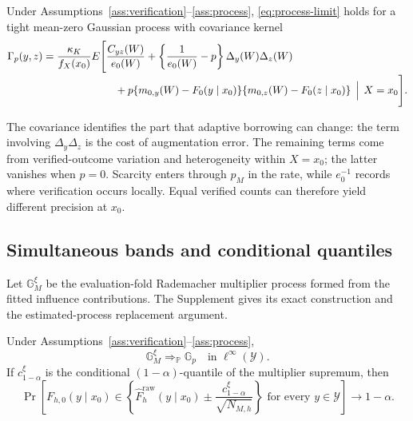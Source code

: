 \begin{theorem}
\label{thm:process}
Under Assumptions~\ref{ass:verification}--\ref{ass:process},
\eqref{eq:process-limit} holds for a tight
mean-zero Gaussian process with covariance kernel
\begin{align}
\Gamma_p(y,z)
&=
\frac{\kappa_K}{f_X(x_0)}
E\Bigg[
\frac{C_{yz}(W)}{e_0(W)}
+
\left\{\frac1{e_0(W)}-p\right\}
\Delta_y(W)\Delta_z(W)
\nonumber\\[-2pt]
&\hspace{24mm}
+p\{m_{0,y}(W)-F_0(y\mid x_0)\}
  \{m_{0,z}(W)-F_0(z\mid x_0)\}
\,\Bigm|\,X=x_0
\Bigg].
\label{eq:cov-limit}
\end{align}
\end{theorem}

The covariance identifies the part that adaptive borrowing can change: the
term involving \(\Delta_y\Delta_z\) is the cost of augmentation error. The
remaining terms come from verified-outcome variation and heterogeneity within
\(X=x_0\); the latter vanishes when \(p=0\). Scarcity enters through \(p_M\) in
the rate, while \(e_0^{-1}\) records where verification occurs locally. Equal
verified counts can therefore yield different precision at \(x_0\).

\subsection{Simultaneous bands and conditional quantiles}

Let \(\mathbb G_M^\xi\) be the evaluation-fold Rademacher multiplier process
formed from the fitted influence contributions. The Supplement gives its exact
construction and the estimated-process replacement argument.

\begin{theorem}
\label{thm:bootstrap}
Under Assumptions~\ref{ass:verification}--\ref{ass:process},
\begin{equation}
\mathbb G_M^\xi
\Rightarrow_{\mathbb P}
\mathbb G_p
\quad\text{in }\ell^\infty(\mathcal Y).
\label{eq:bootstrap-limit}
\end{equation}
If \(c_{1-\alpha}^\xi\) is the conditional \((1-\alpha)\)-quantile of the
multiplier supremum, then
\begin{equation}
\Pr\left[
F_{h,0}(y\mid x_0)
\in
\left\{
\widehat F_h^{\mathrm{raw}}(y\mid x_0)
\pm
\frac{c_{1-\alpha}^\xi}{\sqrt{N_{M,h}}}
\right\}
\text{ for every }y\in\mathcal Y
\right]
\to1-\alpha.
\label{eq:band}
\end{equation}
\end{theorem}

